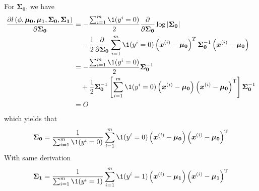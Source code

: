 \documentclass[a4paper]{article}
\begin{document}
\begin{enumerate}
For $\boldsymbol{\Sigma_{0}}$, we have
\begin{equation*}
\begin{aligned} 
  \frac{\partial l\left(\phi, \boldsymbol{\mu_{0}}, \boldsymbol{\mu_{1}}, \boldsymbol{\Sigma_{0}}, \boldsymbol{\Sigma_{1}}\right)}{\partial \boldsymbol{\Sigma_{0}}}
  &=-\frac{\sum_{i=1}^{m} \1 (y^{i}=0)}{2} \frac{\partial}{\partial \boldsymbol{\Sigma_{0}}} \log |\boldsymbol{\Sigma_{0}}|\\
  &\quad -\frac{1}{2} \frac{\partial}{\partial \boldsymbol{\Sigma_{0}}} \sum_{i=1}^{m}\1 (y^{i}=0) \left(\boldsymbol{x}^{(i)}-\boldsymbol{\mu_{0}}\right)^{T} \boldsymbol{\Sigma_{0}}^{-1}\left(\boldsymbol{x}^{(i)}-\boldsymbol{\mu_{0}}\right) \\ 
  &=-\frac{\sum_{i=1}^{m} \1 (y^{i}=0)}{2} \boldsymbol{\Sigma_{0}}^{-1}\\
  &\quad +\frac{1}{2} \boldsymbol{\Sigma_{0}}^{-1}\left[\sum_{i=1}^{m}\1 (y^{i}=0)\left(\boldsymbol{x}^{(i)}-\boldsymbol{\mu_{0}}\right)\left(\boldsymbol{x}^{(i)}-\boldsymbol{\mu_{0}}\right)^{\mathrm{T}}\right] \boldsymbol{\Sigma_{0}}^{-1} \\ 
  &=O 
\end{aligned}
\end{equation*}
which yields that
\begin{equation*}
  \boldsymbol{\Sigma_{0}} = \frac{1}{\sum_{i=1}^{m} \1 (y^{i}=0)} \sum_{i=1}^{m}\1 (y^{i}=0)\left(\boldsymbol{x}^{(i)}-\boldsymbol{\mu_{0}}\right)\left(\boldsymbol{x}^{(i)}-\boldsymbol{\mu_{0}}\right)^{\mathrm{T}}
\end{equation*}
With same derivation
\begin{equation*}
  \boldsymbol{\Sigma_{1}} = \frac{1}{\sum_{i=1}^{m} \1 (y^{i}=1)} \sum_{i=1}^{m}\1 (y^{i}=1)\left(\boldsymbol{x}^{(i)}-\boldsymbol{\mu_{1}}\right)\left(\boldsymbol{x}^{(i)}-\boldsymbol{\mu_{1}}\right)^{\mathrm{T}}
\end{equation*}



\end{enumerate}
\end{document}
